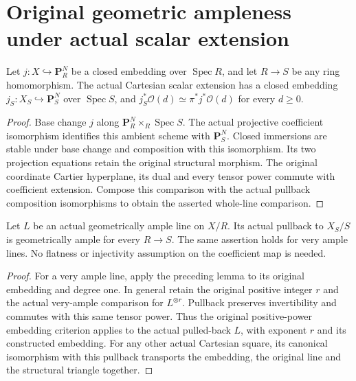\section{Original geometric ampleness under actual scalar extension}

\begin{lemma}
\label{lem:kn-projective-embedding-scalar-extension}
\leanok
Let $j:X\hookrightarrow\mathbf P_R^N$ be a closed embedding over
$\operatorname{Spec}R$, and let $R\to S$ be any ring homomorphism.
The actual Cartesian scalar extension has a closed embedding
$j_S:X_S\hookrightarrow\mathbf P_S^N$ over $\operatorname{Spec}S$,
and $j_S^*\mathcal O(d)\simeq\pi^*j^*\mathcal O(d)$ for every $d\geq0$.
\end{lemma}
\begin{proof}
Base change $j$ along $\mathbf P_R^N\times_R\operatorname{Spec}S$.
The actual projective coefficient isomorphism identifies this ambient
scheme with $\mathbf P_S^N$.  Closed immersions are stable under base
change and composition with this isomorphism.  Its two projection
equations retain the original structural morphism.  The original
coordinate Cartier hyperplane, its dual and every tensor power commute
with coefficient extension.  Compose this comparison with the actual
pullback composition isomorphisms to obtain the asserted whole-line
comparison.
\end{proof}

\begin{theorem}
\label{thm:kn-ample-scalar-extension}
\leanok
{}
Let $L$ be an actual geometrically ample line on $X/R$.  Its actual
pullback to $X_S/S$ is geometrically ample for every $R\to S$.
The same assertion holds for very ample lines.  No flatness or
injectivity assumption on the coefficient map is needed.
\end{theorem}
\begin{proof}
For a very ample line, apply the preceding lemma to its original
embedding and degree one.  In general retain the original positive
integer $r$ and the actual very-ample comparison for $L^{\otimes r}$.
Pullback preserves invertibility and commutes with this same tensor
power.  Thus the original positive-power embedding criterion applies
to the actual pulled-back $L$, with exponent $r$ and its constructed
embedding.  For any other actual Cartesian square, its canonical
isomorphism with this pullback transports the embedding, the original
line and the structural triangle together.
\end{proof}
